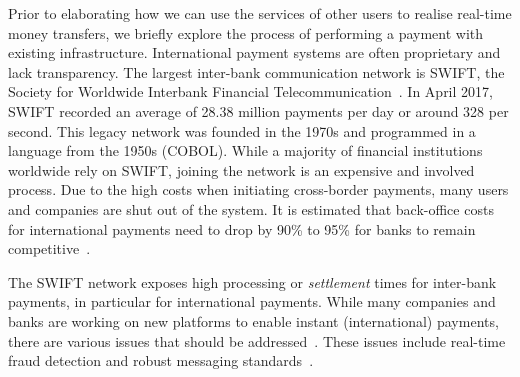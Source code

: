Prior to elaborating how we can use the services of other users to realise real-time money transfers, we briefly explore the process of performing a payment with existing infrastructure.
International payment systems are often proprietary and lack transparency.
The largest inter-bank communication network is SWIFT, the Society for Worldwide Interbank Financial Telecommunication~\cite{swift}.
In April 2017, SWIFT recorded an average of 28.38 million payments per day or around 328 per second.
This legacy network was founded in the 1970s and programmed in a language from the 1950s (COBOL).
While a majority of financial institutions worldwide rely on SWIFT, joining the network is an expensive and involved process.
Due to the high costs when initiating cross-border payments, many users and companies are shut out of the system.
It is estimated that back-office costs for international payments need to drop by 90\% to 95\% for banks to remain competitive~\cite{mckinsey2016payments}.

The SWIFT network exposes high processing or \emph{settlement} times for inter-bank payments, in particular for international payments. %
While many companies and banks are working on new platforms to enable instant (international) payments, there are various issues that should be addressed~\cite{armknecht2015ripple}.
These issues include real-time fraud detection and robust messaging standards~\cite{mckinsey2016payments}.


